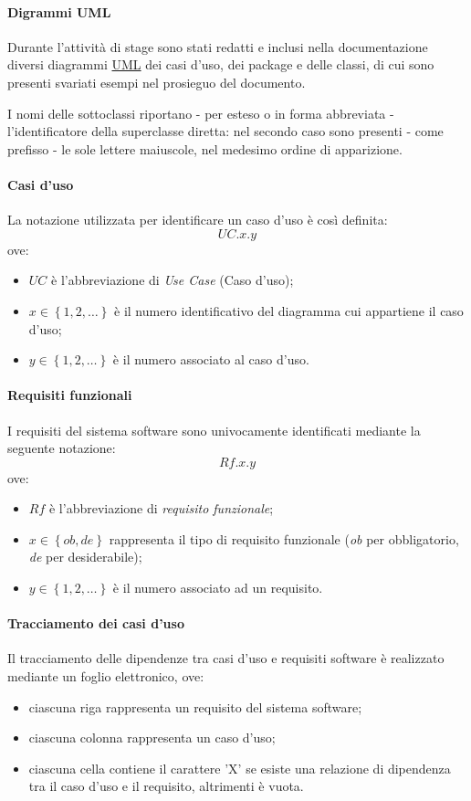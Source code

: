 \paragraph{Digrammi UML}
Durante l'attività di stage sono stati redatti e inclusi nella documentazione diversi diagrammi \underline{UML} dei casi d'uso, dei package e delle classi, di cui sono presenti svariati esempi nel prosieguo del documento.

I nomi delle sottoclassi riportano - per esteso o in forma abbreviata - l'identificatore della superclasse diretta: nel secondo caso sono presenti - come prefisso - le sole lettere maiuscole, nel medesimo ordine di apparizione.

\paragraph{Casi d'uso}
La notazione utilizzata per identificare un caso d'uso è così definita:
$$UC.x.y$$
ove:
\begin{itemize}
\item $UC$ è l'abbreviazione di \textit{Use Case} (Caso d'uso);
\item $x \in \left\{1,2,\ldots\right\}$ è il numero identificativo del diagramma cui appartiene il caso d'uso;
\item $y \in \left\{1,2,\ldots\right\}$ è il numero associato al caso d'uso.
\end{itemize}

\paragraph{Requisiti funzionali}
I requisiti del sistema software sono univocamente identificati mediante la seguente notazione:
$$Rf.x.y$$
ove:
\begin{itemize}
\item $Rf$ è l'abbreviazione di \textit{requisito funzionale};
\item $x \in \left\{ob,de\right\}$ rappresenta il tipo di requisito funzionale (\textit{ob} per obbligatorio, \textit{de} per desiderabile);
\item $y \in \left\{1,2,\ldots\right\}$ è il numero associato ad un requisito.
\end{itemize}

\paragraph{Tracciamento dei casi d'uso}
Il tracciamento delle dipendenze tra casi d'uso e requisiti software è realizzato mediante un foglio elettronico, ove:
\begin{itemize}
\item ciascuna riga rappresenta un requisito del sistema software;
\item ciascuna colonna rappresenta un caso d'uso;
\item ciascuna cella contiene il carattere 'X' se esiste una relazione di dipendenza tra il caso d'uso e il requisito, altrimenti è vuota.
\end{itemize}

